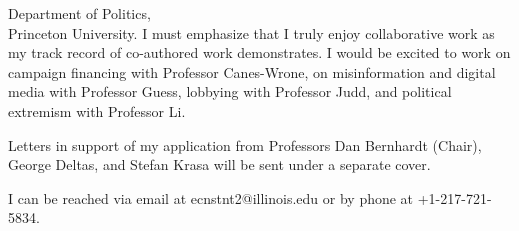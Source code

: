 \documentclass[12pt]{letter}
\begin{document}
\begin{letter}{Department of Politics,\\
Princeton University.}
I must emphasize that I truly enjoy collaborative work as my track record of co-authored work demonstrates.
I would be excited to work on campaign financing with Professor Canes-Wrone, on misinformation and digital media with Professor Guess, lobbying with Professor Judd, and political extremism with Professor Li.




Letters in support of my application from Professors Dan Bernhardt (Chair), George Deltas, and Stefan Krasa will be sent under a separate cover. 






I can be reached via email at ecnstnt2@illinois.edu or by phone at +1-217-721-5834.


\end{letter}
\end{document}

